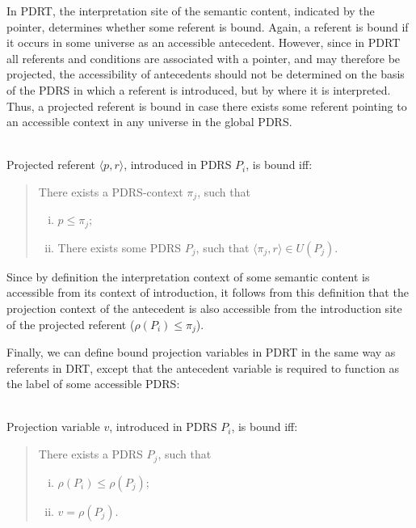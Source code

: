 In PDRT, the interpretation site of the semantic content, indicated by the
pointer, determines whether some referent is bound. Again, a referent is
bound if it occurs in some universe as an accessible antecedent. However,
since in PDRT all referents and conditions are associated with a pointer,
and may therefore be projected, the accessibility of antecedents should not
be determined on the basis of the PDRS in which a referent is introduced,
but by where it is interpreted. Thus, a projected referent is bound in case
there exists some referent pointing to an accessible context in any universe
in the global PDRS. 

\begin{definition}~\\
Projected referent $\langle p,r\rangle$, introduced in PDRS $P_i$, is bound
iff:
\begin{quote}
There exists a PDRS-context $\pi_j$, such that
\begin{enumerate}[i.]
  \item $p \leq \pi_j$; 
  \item There exists some PDRS $P_j$, such that 
    $\langle \pi_j,r\rangle \in U(P_j)$.
\end{enumerate}
\end{quote}
\end{definition}

\noindent Since by definition the interpretation context of some semantic
content is accessible from its context of introduction, it follows from this
definition that the projection context of the antecedent is also accessible
from the introduction site of the projected referent ($\rho(P_i) \leq
\pi_j$). 

Finally, we can define bound projection variables in PDRT in the same way as
referents in DRT, except that the antecedent variable is required to
function as the label of some accessible PDRS:

\begin{definition}~\\
Projection variable $v$, introduced in PDRS $P_i$, is bound iff:
\begin{quote}
There exists a PDRS $P_j$, such that
\begin{enumerate}[i.]
  \item $\rho(P_i) \leq \rho(P_j)$; 
  \item $v = \rho(P_j)$.
\end{enumerate}
\end{quote}
\end{definition}


